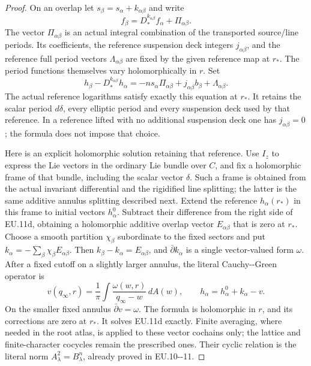 \begin{proof}
On an overlap let \(s_\beta=s_\alpha+k_{\alpha\beta}\) and write
\[
 f_\beta=D_*^{k_{\alpha\beta}}f_\alpha+
                         \Pi_{\alpha\beta}.
\]
The vector \(\Pi_{\alpha\beta}\) is an actual integral combination
of the transported source/line periods. Its coefficients, the
reference suspension deck integers \(j_{\alpha\beta}\), and the
reference full period vectors \(\Lambda_{\alpha\beta}\) are fixed
by the given reference map at \(r_*\). The period functions themselves
vary holomorphically in \(r\). Set
\[
 h_\beta-D_*^{k_{\alpha\beta}}h_\alpha
  =-n s_\alpha\Pi_{\alpha\beta}
          +j_{\alpha\beta}b_\beta+\Lambda_{\alpha\beta}.
 \tag{EU.11d}
\]
The actual reference logarithms satisfy exactly this equation at
\(r_*\). It retains the scalar period \(d\delta\), every elliptic
period and every suspension deck used by that reference. In a
reference lifted with no additional suspension deck one has
\(j_{\alpha\beta}=0\); the formula does not impose that choice.

Here is an explicit holomorphic solution retaining that reference.
Use \(I_z\) to express the Lie vectors in the ordinary Lie bundle
over \(C\), and fix a holomorphic frame of that bundle, including
the scalar vector \(\delta\). Such a frame is obtained from the
actual invariant differential and the rigidified line splitting;
the latter is the same additive annulus splitting described next.
Extend the reference \(h_\alpha(r_*)\) in this frame to initial
vectors \(h^0_\alpha\). Subtract their difference from the right
side of EU.11d, obtaining a holomorphic additive overlap vector
\(E_{\alpha\beta}\) that is zero at \(r_*\).
Choose a smooth partition \(\chi_\beta\) subordinate to the fixed
sectors and put \(k_\alpha=-\sum_\beta\chi_\beta
E_{\alpha\beta}\). Then \(k_\beta-k_\alpha=E_{\alpha\beta}\),
and \(\bar\partial k_\alpha\) is a single vector-valued form
\(\omega\). After a fixed cutoff on a slightly larger annulus,
the literal Cauchy-\/-Green operator is
\[
 v(q_\infty,r)=\frac1\pi\int
            \frac{\omega(w,r)}{q_\infty-w}\,dA(w),\qquad
 h_\alpha=h^0_\alpha+k_\alpha-v.
 \tag{EU.11e}
\]
On the smaller fixed annulus \(\bar\partial v=\omega\).
The formula is holomorphic in \(r\), and its corrections are zero
at \(r_*\). It solves EU.11d exactly. Finite averaging, where
needed in the root atlas, is applied to these vector cochains only;
the lattice and finite-character cocycles remain the prescribed
ones. Their cyclic relation is the literal norm
\(A_\lambda^2=B_\lambda^n\), already proved in EU.10-\/-11.


\end{proof}
